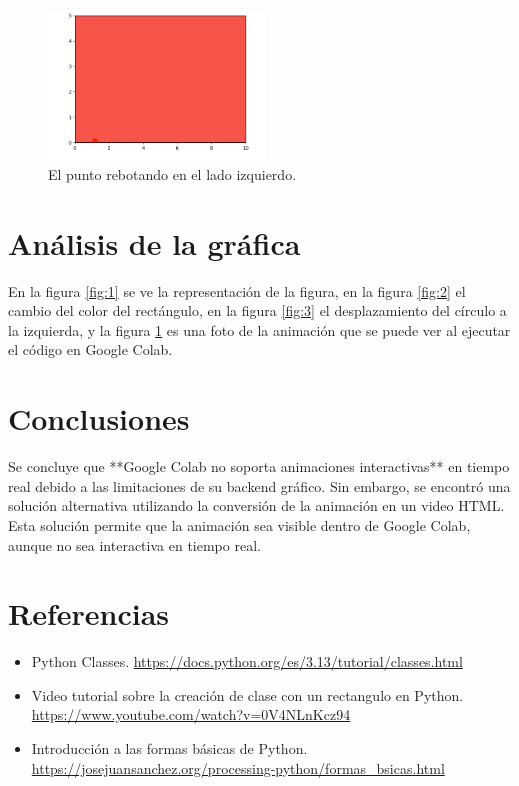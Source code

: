 \documentclass[a4paper, 10pt]{article}
\begin{document}
\begin{figure}[H]
\centering
\includegraphics[width=5.8cm]{grafica4.png} %
\caption{El punto rebotando en el lado izquierdo.}
\label{fig:4}
\end{figure}

\section{Análisis de la gráfica}\label{s:5}
En la figura \ref{fig:1} se ve la representación de la figura, en la figura \ref{fig:2} el cambio del color del rectángulo, en la figura \ref{fig:3} el desplazamiento del círculo a la izquierda, y la figura \ref{fig:4} es una foto de la animación que se puede ver al ejecutar el código en Google Colab.

\section{Conclusiones}\label{s:6}
Se concluye que **Google Colab no soporta animaciones interactivas** en tiempo real debido a las limitaciones de su backend gráfico. Sin embargo, se encontró una solución alternativa utilizando la conversión de la animación en un video HTML. Esta solución permite que la animación sea visible dentro de Google Colab, aunque no sea interactiva en tiempo real.

\section{Referencias}\label{s:7}
\begin{itemize}
    \item Python Classes. \href{https://docs.python.org/es/3.13/tutorial/classes.html}{https://docs.python.org/es/3.13/tutorial/classes.html}
    \item Video tutorial sobre la creación de clase con un rectangulo en Python. \href{https://www.youtube.com/watch?v=0V4NLnKcz94}{https://www.youtube.com/watch?v=0V4NLnKcz94}
    \item Introducción a las formas básicas de Python. \href{https://josejuansanchez.org/processing-python/formas_bsicas.html}{https://josejuansanchez.org/processing-python/formas_bsicas.html}
\end{itemize}
\end{document}
